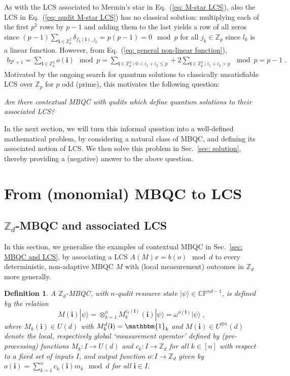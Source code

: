 \documentclass[aps,pra,letterpaper,onrcolumn,nofootinbib,notitlepage,longbibliography]{revtex4-1}
\newtheorem{definition}{Definition}
\newcommand{\mf}[1]{#1}
\newcommand{\one}{\mathbbm{1}}
\newcommand{\ra}{\ensuremath{\rightarrow}}
\newcommand{\zz}{\mathbb Z}
\newcommand{\bi}{\mathbf{i}}
\begin{document}
As with the LCS associated to Mermin's star in Eq.~(\ref{eq: M-star LCS}), also the LCS in Eq.~(\ref{eq: qudit M-star LCS}) has no classical solution: multiplying each of the first $p^2$ rows by $p-1$ and adding them to the last yields a row of all zeros since $(p-1)\sum_{\bi\in\zz^2_p} \delta_{f_k(\bi),j_k}=p(p-1)=0 \mod p$ for all $j_k\in\zz_p$ since $l_k$ is a linear function. However, from Eq.~(\ref{eq: general non-linear function}),
\begin{align*}
    b_{2^p+1}
    = \sum_{\bi\in\zz^2_p} o(\bi) \mod p
    = \sum_{\bi\in\zz^2_p\mid 0<i_1+i_2 \leq p} + 2\sum_{\bi\in\zz^2_p \mid i_1+i_2 > p} \mod p
    = p-1\; .
\end{align*}
Motivated by the ongoing search for quantum solutions to classically unsatisfiable LCS over $\zz_p$ for $p$ odd (prime), this motivates the following question:
\begin{center}
    \emph{Are there contextual MBQC with qudits which define quantum solutions to their associated LCS?}
\end{center}
\mf{In the next section, we will turn this informal question into a well-defined mathematical problem, by considering a natural class of MBQC, and defining its associated notion of LCS. We then solve this problem in Sec.~\ref{sec: solution}, thereby providing a (negative) answer to the above question.}



\section{From (monomial) MBQC to LCS}\label{sec: from MBQC to LCS}

\subsection{$\zz_d$-MBQC and associated LCS}\label{sec: constraints on MBQC}

In this section, we generalise the examples of contextual MBQC in Sec.~\ref{sec: MBQC and LCS}, by associating a LCS $A(M)x=b(o) \mod d$ to every deterministic, non-adaptive MBQC $M$ with (local measurement) outcomes in $\zz_d$ more generally.


\begin{definition}\label{def: Z_p-MBQC}
    A \emph{$\zz_d$-MBQC, with $n$-qudit resource state $|\psi\rangle\in\mathbb{CP}^{nd-1}$}, is defined by the relation
    \begin{equation}\label{eq: output function in MBQC}
        M(\bi)|\psi\rangle
        =\otimes_{k=1}^n M^{c_k(\bi)}_k(\bi)|\psi\rangle
        = \omega^{o(\bi)}|\psi\rangle\; ,
    \end{equation}
    where $M_k(\bi)\in U(d)$ with $M^d_k(\bi)=\one_k$ and $M(\bi)\in U^{\otimes n}(d)$ denote the local, respectively global `measurement operator' defined by (pre-processing) functions $M_k:I\ra U(d)$ and $c_k:I\ra\zz_d$ for all $k\in[n]$ with respect to a fixed set of inputs $I$, and output function $o:I\rightarrow\zz_d$ given by $o(\bi)=\sum_{k=1}^n c_k(\bi)m_k\mod d$ for all $\bi\in I$.
\end{definition}
\end{document}
